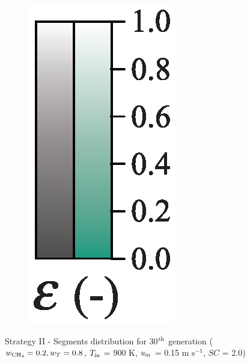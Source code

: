 \documentclass[preprint,12pt]{elsarticle}
\begin{document}
\begin{figure}[h!]
\begin{subfigure}[b]{0.1\textwidth}
     	\includegraphics[width=\textwidth]{segments_porosity.eps}
     \end{subfigure}
\caption{\label{fig:30L6040G1-TField} Strategy II - Segments distribution for 30$^{\rm{th}}$ generation ($w_{\rm{CH_4}} = 0.2, w_T = 0.8$, $T_{\rm{in}}$ = 900 K, $u_{\rm{in}}$ = 0.15 m s$^{-1}$, $SC$ = 2.0)}
\end{figure}
\end{document}
